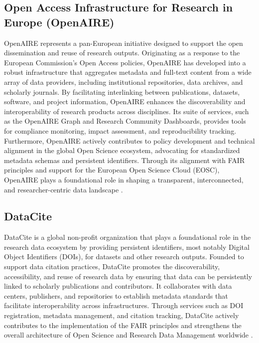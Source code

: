 \documentclass[final]{rc-book-2.14}
\begin{document}
\subsection{Open Access Infrastructure for Research in Europe (OpenAIRE)}
OpenAIRE represents a pan-European initiative designed to support the open dissemination and reuse of research outputs. Originating as a response to the European Commission's Open Access policies, OpenAIRE has developed into a robust infrastructure that aggregates metadata and full-text content from a wide array of data providers, including institutional repositories, data archives, and scholarly journals. By facilitating interlinking between publications, datasets, software, and project information, OpenAIRE enhances the discoverability and interoperability of research products across disciplines. Its suite of services, such as the OpenAIRE Graph and Research Community Dashboards, provides tools for compliance monitoring, impact assessment, and reproducibility tracking. Furthermore, OpenAIRE actively contributes to policy development and technical alignment in the global Open Science ecosystem, advocating for standardized metadata schemas and persistent identifiers. Through its alignment with FAIR principles and support for the European Open Science Cloud (EOSC), OpenAIRE plays a foundational role in shaping a transparent, interconnected, and researcher-centric data landscape \cite{rettberg_openaire_2012}.

\subsection{DataCite}
DataCite is a global non-profit organization that plays a foundational role in the research data ecosystem by providing persistent identifiers, most notably Digital Object Identifiers (DOIs), for datasets and other research outputs. Founded to support data citation practices, DataCite promotes the discoverability, accessibility, and reuse of research data by ensuring that data can be persistently linked to scholarly publications and contributors. It collaborates with data centers, publishers, and repositories to establish metadata standards that facilitate interoperability across infrastructures. Through services such as DOI registration, metadata management, and citation tracking, DataCite actively contributes to the implementation of the FAIR principles and strengthens the overall architecture of Open Science and Research Data Management worldwide \cite{brase_datacite_2009}.
\end{document}

